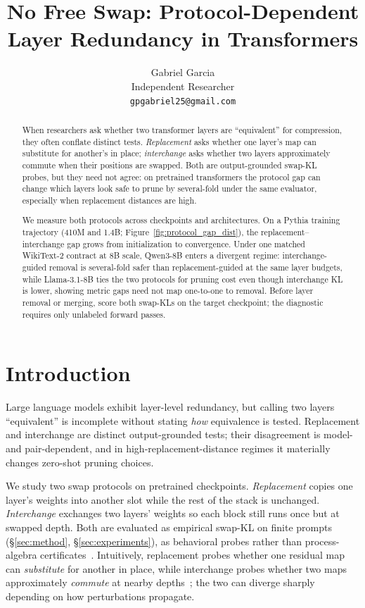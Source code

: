 \documentclass{article}
\title{No Free Swap: Protocol-Dependent Layer Redundancy in Transformers}
\author{
  Gabriel Garcia \\
  Independent Researcher \\
  \texttt{gpgabriel25@gmail.com}
}
\begin{document}
\maketitle

\begin{abstract}
When researchers ask whether two transformer layers are ``equivalent'' for compression, they often conflate distinct tests. \emph{Replacement} asks whether one layer's map can substitute for another's in place; \emph{interchange} asks whether two layers approximately commute when their positions are swapped. Both are output-grounded swap-KL probes, but they need not agree: on pretrained transformers the protocol gap can change which layers look safe to prune by several-fold under the same evaluator, especially when replacement distances are high.

We measure both protocols across checkpoints and architectures. On a Pythia training trajectory (410M and 1.4B; Figure~\ref{fig:protocol_gap_dist}), the replacement--interchange gap grows from initialization to convergence. Under one matched WikiText-2 contract at 8B scale, Qwen3-8B enters a divergent regime: interchange-guided removal is several-fold safer than replacement-guided at the same layer budgets, while Llama-3.1-8B ties the two protocols for pruning cost even though interchange KL is lower, showing metric gaps need not map one-to-one to removal. Before layer removal or merging, score both swap-KLs on the target checkpoint; the diagnostic requires only unlabeled forward passes.
\end{abstract}

\section{Introduction}
\label{sec:intro}

Large language models exhibit layer-level redundancy, but calling two layers ``equivalent'' is incomplete without stating \emph{how} equivalence is tested. Replacement and interchange are distinct output-grounded tests; their disagreement is model- and pair-dependent, and in high-replacement-distance regimes it materially changes zero-shot pruning choices.

We study two swap protocols on pretrained checkpoints. \emph{Replacement} copies one layer's weights into another slot while the rest of the stack is unchanged. \emph{Interchange} exchanges two layers' weights so each block still runs once but at swapped depth. Both are evaluated as empirical swap-KL on finite prompts (\S\ref{sec:method}, \S\ref{sec:experiments}), as behavioral probes rather than process-algebra certificates~\citep{milner1989communication, park1981concurrency}. Intuitively, replacement probes whether one residual map can \emph{substitute} for another in place, while interchange probes whether two maps approximately \emph{commute} at nearby depths~\citep{veit2016residual}; the two can diverge sharply depending on how perturbations propagate.
\end{document}
